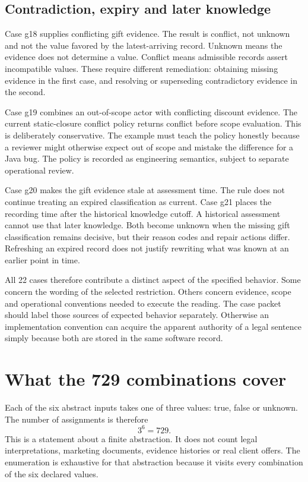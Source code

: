 \subsection{Contradiction, expiry and later knowledge}
Case g18 supplies conflicting gift evidence. The result is conflict, not
unknown and not the value favored by the latest-arriving record. Unknown means
the evidence does not determine a value. Conflict means admissible records
assert incompatible values. These require different remediation: obtaining
missing evidence in the first case, and resolving or superseding contradictory
evidence in the second.

Case g19 combines an out-of-scope actor with conflicting discount evidence.
The current static-closure conflict policy returns conflict before scope
evaluation. This is deliberately conservative. The example must teach the
policy honestly because a reviewer might otherwise expect out of scope and
mistake the difference for a Java bug. The policy is recorded as engineering
semantics, subject to separate operational review.

Case g20 makes the gift evidence stale at assessment time. The rule does not
continue treating an expired classification as current. Case g21 places the
recording time after the historical knowledge cutoff. A historical assessment
cannot use that later knowledge. Both become unknown when the missing gift
classification remains decisive, but their reason codes and repair actions
differ. Refreshing an expired record does not justify rewriting what was known
at an earlier point in time.

All 22 cases therefore contribute a distinct aspect of the specified behavior.
Some concern the wording of the selected restriction. Others concern evidence,
scope and operational conventions needed to execute the reading. The case
packet should label those sources of expected behavior separately. Otherwise
an implementation convention can acquire the apparent authority of a legal
sentence simply because both are stored in the same software record.

\section{What the 729 combinations cover}
\label{merge:M02:04}

\label{sec:circular-enumeration}
Each of the six abstract inputs takes one of three values: true, false or
unknown. The number of assignments is therefore
\begin{equation}
 3^6=729.
 \label{eq:case-domain-size}
\end{equation}
This is a statement about a finite abstraction. It does not count legal
interpretations, marketing documents, evidence histories or real client offers.
The enumeration is exhaustive for that abstraction because it visits every
combination of the six declared values.

